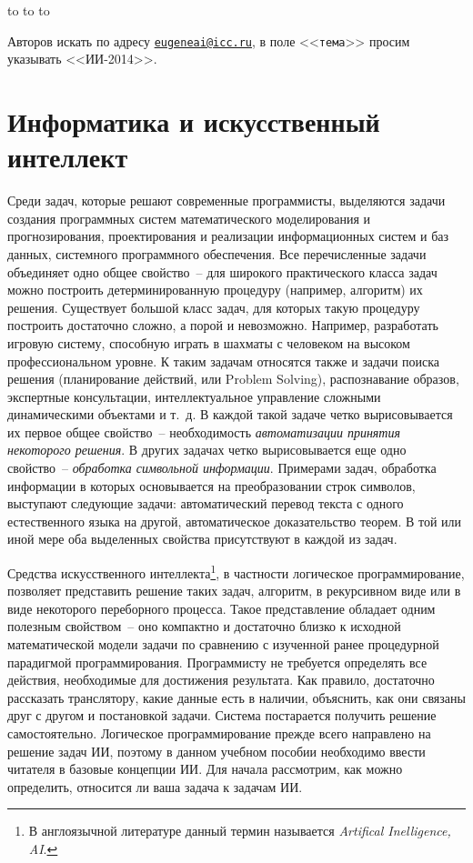 \documentclass[a4paper,14pt, openany, twoside, final]{extbook} %
\newcommand{\aaa}[2][acolor]{\noindent\textcolor{eclr}%
{+\ [}\textcolor{#1}{#2}\textcolor{eclr}{]}}
\begin{document}

\medskip

\noindent\hbox to \linewidth{\hfill\sf От имени и по поручению коллектива авторов,}
\noindent\hbox to \linewidth{\hfill\sf доцент кафедры ИТ ИМЭИ ИГУ}
\noindent\hbox to \linewidth{\hfill\sf канд.~техн.~наук Е.~А.~Черкашин}

\vfill
\makeatletter
{} Авторов искать по адресу \href{mailto:eugeneai@icc.ru}{\tt{}eugeneai@icc.ru}, в поле <<{\tt тема}>> просим указывать <<ИИ-2014>>.
\makeatother

\chapter{Информатика и искусственный интеллект}

Среди задач, которые решают современные программисты, выделяются задачи создания программных систем математического моделирования и прогнозирования, проектирования и реализации информационных систем и баз данных, системного программного обеспечения. Все перечисленные задачи объединяет одно общее свойство~-- для широкого практического класса задач можно построить детерминированную процедуру (например, алгоритм) их решения. Существует большой класс задач, для которых такую процедуру построить достаточно сложно, а порой и невозможно. Например, разработать игровую систему, способную играть в шахматы с человеком на высоком профессиональном уровне. К таким задачам относятся также и задачи поиска решения (планирование действий, или Problem Solving), распознавание образов, экспертные консультации, интеллектуальное управление сложными динамическими объектами и т.~д. В каждой такой задаче четко вырисовывается их первое общее свойство~-- необходимость {\em автоматизации принятия некоторого решения}. В других задачах четко вырисовывается еще одно свойство~-- {\em обработка символьной информации}. Примерами задач, обработка информации в которых основывается на преобразовании строк символов, выступают следующие задачи: автоматический перевод текста с одного естественного языка на другой, автоматическое доказательство теорем. В той или иной мере оба выделенных свойства присутствуют в каждой из задач.

Средства искусственного интеллекта\footnote{В англоязычной литературе данный термин называется \emph{Artifical Inelligence, AI}.}, в частности логическое программирование, позволяет представить решение таких задач, алгоритм, в рекурсивном виде или в виде некоторого переборного процесса. Такое представление обладает одним полезным свойством~-- оно компактно и достаточно близко к исходной математической модели задачи по сравнению с изученной ранее процедурной парадигмой программирования. Программисту не требуется определять все действия, необходимые для достижения результата. Как правило, достаточно рассказать транслятору, какие данные есть в наличии, объяснить, как они связаны друг с другом и постановкой задачи. Система постарается получить решение самостоятельно. Логическое программирование прежде всего направлено на решение задач ИИ, поэтому в данном учебном пособии необходимо ввести читателя в базовые концепции ИИ. Для начала рассмотрим, как можно определить, относится ли ваша задача к задачам ИИ.
\end{document}
